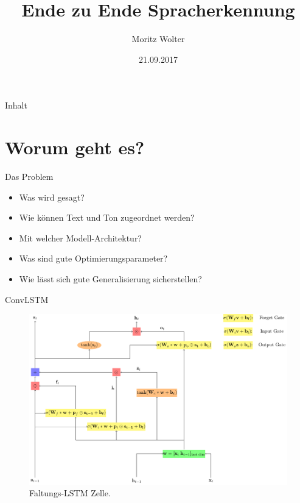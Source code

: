 \documentclass[10pt]{beamer}
\title{Ende zu Ende Spracherkennung}
\author{Moritz Wolter}
\date{21.09.2017}
\begin{document}
\begin{frame}
  \titlepage
\end{frame}




\begin{frame}{Inhalt}
  \tableofcontents
\end{frame}

\section{Worum geht es?}
\begin{frame}{Das Problem}
	\begin{itemize}
		\item Was wird gesagt?
		\item Wie können Text und Ton zugeordnet werden?
		\item Mit welcher Modell-Architektur?
		\item Was sind gute Optimierungsparameter?
		\item Wie lässt sich gute Generalisierung sicherstellen?
	\end{itemize}
\end{frame}

\begin{frame}{ConvLSTM}
\begin{figure}
\includegraphics[scale=0.55]{../tikz/convLSTM}
\caption{Faltungs-LSTM Zelle.}
\end{figure}
\end{frame}
\end{document}
